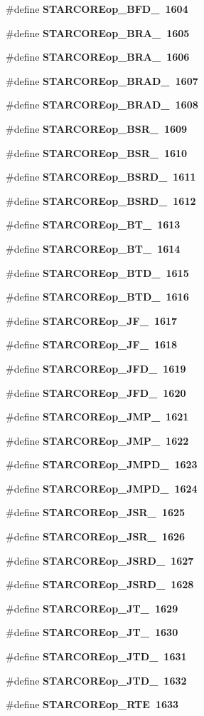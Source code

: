 \begin{CompactItemize}
\#define \bf{STARCOREop\_\-BFD\_}~1604
\item 
\#define \bf{STARCOREop\_\-BRA\_}~1605
\item 
\#define \bf{STARCOREop\_\-BRA\_}~1606
\item 
\#define \bf{STARCOREop\_\-BRAD\_}~1607
\item 
\#define \bf{STARCOREop\_\-BRAD\_}~1608
\item 
\#define \bf{STARCOREop\_\-BSR\_}~1609
\item 
\#define \bf{STARCOREop\_\-BSR\_}~1610
\item 
\#define \bf{STARCOREop\_\-BSRD\_}~1611
\item 
\#define \bf{STARCOREop\_\-BSRD\_}~1612
\item 
\#define \bf{STARCOREop\_\-BT\_}~1613
\item 
\#define \bf{STARCOREop\_\-BT\_}~1614
\item 
\#define \bf{STARCOREop\_\-BTD\_}~1615
\item 
\#define \bf{STARCOREop\_\-BTD\_}~1616
\item 
\#define \bf{STARCOREop\_\-JF\_}~1617
\item 
\#define \bf{STARCOREop\_\-JF\_}~1618
\item 
\#define \bf{STARCOREop\_\-JFD\_}~1619
\item 
\#define \bf{STARCOREop\_\-JFD\_}~1620
\item 
\#define \bf{STARCOREop\_\-JMP\_}~1621
\item 
\#define \bf{STARCOREop\_\-JMP\_}~1622
\item 
\#define \bf{STARCOREop\_\-JMPD\_}~1623
\item 
\#define \bf{STARCOREop\_\-JMPD\_}~1624
\item 
\#define \bf{STARCOREop\_\-JSR\_}~1625
\item 
\#define \bf{STARCOREop\_\-JSR\_}~1626
\item 
\#define \bf{STARCOREop\_\-JSRD\_}~1627
\item 
\#define \bf{STARCOREop\_\-JSRD\_}~1628
\item 
\#define \bf{STARCOREop\_\-JT\_}~1629
\item 
\#define \bf{STARCOREop\_\-JT\_}~1630
\item 
\#define \bf{STARCOREop\_\-JTD\_}~1631
\item 
\#define \bf{STARCOREop\_\-JTD\_}~1632
\item 
\#define \bf{STARCOREop\_\-RTE}~1633

\end{CompactItemize}
